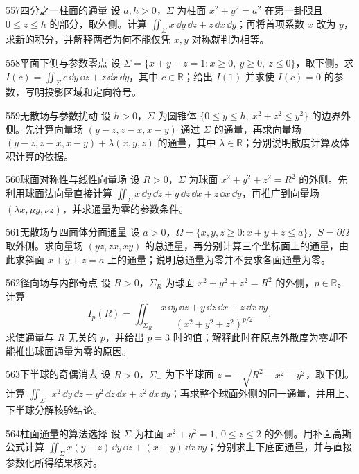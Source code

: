 \begin{exercise}{557}{四分之一柱面的通量}
设 $a,h>0$，$\Sigma$ 为柱面 $x^2+y^2=a^2$ 在第一卦限且 $0\le z\le h$ 的部分，取外侧。计算 $\iint_{\Sigma}x\,\dd y\,\dd z+z\,\dd x\,\dd y$；再将首项系数 $x$ 改为 $y$，求新的积分，并解释两者为何不能仅凭 $x,y$ 对称就判为相等。
\end{exercise}
\begin{exercise}{558}{平面下侧与参数零点}
设 $\Sigma=\{x+y-z=1:x\ge0,\ y\ge0,\ z\le0\}$，取下侧。求 $I(c)=\iint_{\Sigma}c\,\dd y\,\dd z+z\,\dd x\,\dd y$，其中 $c\in\mathbb R$；给出 $I(1)$ 并求使 $I(c)=0$ 的参数，写明投影区域和定向符号。
\end{exercise}
\begin{exercise}{559}{无散场与参数扰动}
设 $h>0$，$\Sigma$ 为圆锥体 $\{0\le y\le h,\ x^2+z^2\le y^2\}$ 的边界外侧。先计算向量场 $(y-z,z-x,x-y)$ 通过 $\Sigma$ 的通量，再求向量场 $(y-z,z-x,x-y)+\lambda(x,y,z)$ 的通量，其中 $\lambda\in\mathbb R$；分别说明散度计算及体积计算的依据。
\end{exercise}
\begin{exercise}{560}{球面对称性与线性向量场}
设 $R>0$，$\Sigma$ 为球面 $x^2+y^2+z^2=R^2$ 的外侧。先利用球面法向量直接计算 $\iint_{\Sigma}x\,\dd y\,\dd z+y\,\dd z\,\dd x+z\,\dd x\,\dd y$，再推广到向量场 $(\lambda x,\mu y,\nu z)$，并求通量为零的参数条件。
\end{exercise}
\begin{exercise}{561}{无散场与四面体分面通量}
设 $a>0$，$\Omega=\{x,y,z\ge0:x+y+z\le a\}$，$S=\partial\Omega$ 取外侧。求向量场 $(yz,zx,xy)$ 的总通量，再分别计算三个坐标面上的通量，由此求斜面 $x+y+z=a$ 上的通量；说明总通量为零并不要求各面通量为零。
\end{exercise}
\begin{exercise}{562}{径向场与内部奇点}
设 $R>0$，$\Sigma_R$ 为球面 $x^2+y^2+z^2=R^2$ 的外侧，$p\in\mathbb R$。计算
\[I_p(R)=\iint_{\Sigma_R}\frac{x\,\dd y\,\dd z+y\,\dd z\,\dd x+z\,\dd x\,\dd y}{(x^2+y^2+z^2)^{p/2}},\]
求使通量与 $R$ 无关的 $p$，并给出 $p=3$ 时的值；解释此时在原点外散度为零却不能推出球面通量为零的原因。
\end{exercise}
\begin{exercise}{563}{下半球的奇偶消去}
设 $R>0$，$\Sigma_-$ 为下半球面 $z=-\sqrt{R^2-x^2-y^2}$，取下侧。计算 $\iint_{\Sigma_-}x^2\,\dd y\,\dd z+y^2\,\dd z\,\dd x+z^2\,\dd x\,\dd y$；再求整个球面外侧的同一通量，并用上、下半球分解核验结论。
\end{exercise}
\begin{exercise}{564}{柱面通量的算法选择}
设 $\Sigma$ 为柱面 $x^2+y^2=1,\ 0\le z\le2$ 的外侧。用补面高斯公式计算 $\iint_{\Sigma}x(y-z)\,\dd y\,\dd z+(x-y)\,\dd x\,\dd y$；分别求上下底面通量，并与直接参数化所得结果核对。
\end{exercise}
